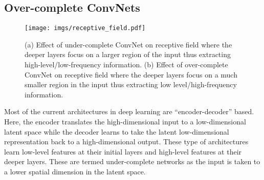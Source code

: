\documentclass[journal]{IEEEtran}
\begin{document}
\subsection{Over-complete ConvNets}
\begin{figure}[tb]
    \centering
    \texttt{[image: imgs/receptive\_field.pdf]}
    \caption{(a) Effect of under-complete ConvNet on receptive field where the deeper layers focus on a larger region of the input thus extracting high-level/low-frequency information. (b) Effect of over-complete ConvNet on receptive field where the deeper layers focus on a much smaller region in the input thus extracting low level/high-frequency information.}
    \label{fig:receptive_field}
\end{figure}
 Most of the current architectures in deep learning are  ``encoder-decoder'' \cite{ronneberger2015u, badrinarayanan2017segnet, he2016deep} based. Here, the encoder  translates the high-dimensional input to a low-dimensional latent space  while the decoder learns to take the latent low-dimensional representation back to a high-dimensional output.  These type of architectures learn low-level features at their initial layers and high-level features at their deeper layers. These are termed under-complete networks as the input is taken to a lower spatial dimension in the latent space.
 
\end{document}
